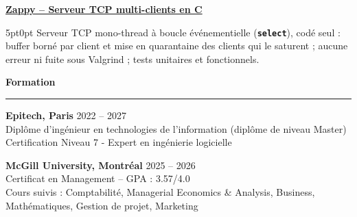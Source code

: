 \documentclass[9pt]{extarticle}
\begin{document}
\par\vspace{8pt}

\underline{\bfseries Zappy -- Serveur TCP multi-clients en C}
\par
\begin{adjustwidth}{5pt}{0pt}
    Serveur TCP mono-thread à boucle événementielle ({\bfseries \texttt{select}}), codé seul : buffer borné par client et mise en quarantaine des clients qui le saturent ; aucune erreur ni fuite sous Valgrind ; tests unitaires et fonctionnels.
\end{adjustwidth}

\par\vspace{8pt}


{\large\bfseries Formation}
\par\vspace{-8pt}
\rule{\linewidth}{0.4pt}
\par\vspace{5pt}

{\bfseries Epitech, Paris} \hfill 2022 -- 2027 \\
Diplôme d'ingénieur en technologies de l'information (diplôme de niveau Master) \\
Certification Niveau 7 - Expert en ingénierie logicielle

\vspace{6pt}

{\bfseries McGill University, Montréal} \hfill 2025 -- 2026 \\
Certificat en Management -- GPA : 3.57/4.0 \\
Cours suivis : Comptabilité, Managerial Economics \& Analysis, Business, Mathématiques, Gestion de projet, Marketing
\end{document}
